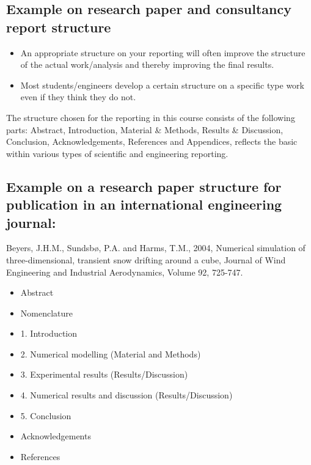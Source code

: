 \documentclass[a4paper,11pt]{extarticle}
\begin{document}
\pagebreak
\begin{appendices}

\setcounter{figure}{0}
\setcounter{table}{0}
\setcounter{equation}{0}

\renewcommand\thefigure{\thesection.\arabic{figure}}   
\renewcommand\thetable{\thesection.\arabic{table}}   
\renewcommand\theequation{\thesection.\arabic{equation}} 

\section{Example on research paper and consultancy report structure}
\begin{itemize}
  \item An appropriate structure on your reporting will often improve the structure of the actual work/analysis and thereby improving the final results.
  \item Most students/engineers develop a certain structure on a specific type work even if they think they do not.
\end{itemize}

The structure chosen for the reporting in this course consists of the following parts: Abstract, Introduction, Material \& Methods, Results \& Discussion, Conclusion, Acknowledgements, References and Appendices, reflects the basic within various types of scientific and engineering reporting. 

\subsection{Example on a research paper structure for publication in an international engineering journal:}
Beyers, J.H.M., Sundsbø, P.A. and Harms, T.M., 2004, Numerical simulation of three-dimensional, transient snow drifting around a cube, Journal of Wind Engineering and Industrial Aerodynamics, Volume 92, 725-747.

\begin{itemize}
  \item Abstract
  \item Nomenclature
  \item 1. Introduction
  \item 2. Numerical modelling (Material and Methods)
  \item 3. Experimental results (Results/Discussion)
  \item 4. Numerical results and discussion (Results/Discussion)
  \item 5. Conclusion
  \item Acknowledgements
  \item References
\end{itemize}


\end{appendices}
\end{document}
